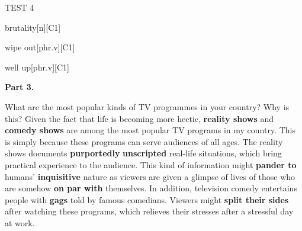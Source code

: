 \begin{glossarymc}[Cambridge 11]
\begin{test}{TEST 4}
\begin{VocabExplain}[Part 2]
            \begin{ExplainCard}{brutality}[n][C1]
            \end{ExplainCard}

            \begin{ExplainCard}{wipe out}[phr.v][C1]
            \end{ExplainCard}

            \begin{ExplainCard}{well up}[phr.v][C1]
            \end{ExplainCard}
        \end{VocabExplain}

    \noindent
    \textbf{Part 3.}
    \begin{qa}{What are the most popular kinds of TV programmes in your country? Why is this?}
    Given the fact that life is becoming more hectic, \textbf{reality shows} and \textbf{comedy shows} are among the most popular TV programs in my country. This is simply because these programs can serve audiences of all ages. The reality shows documents \textbf{purportedly} \textbf{unscripted} real-life situations, which bring practical experience to the audience. This kind of information might \textbf{pander to} humans’ \textbf{inquisitive} nature as viewers are given a glimpse of lives of those who are somehow \textbf{on par with} themselves. In addition, television comedy entertains people with \textbf{gags} told by famous comedians. Viewers might \textbf{split their sides} after watching these programs, which relieves their stresses after a stressful day at work.
    \end{qa}


\end{test}
\end{glossarymc}
